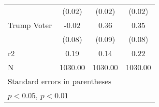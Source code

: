 \begin{table}[htbp]
\begin{tabular}{l*{3}{c}}
                    &      (0.02)        &      (0.02)        &      (0.02)        \\
[1em]
Trump Voter         &       -0.02        &        0.36\sym{**}&        0.35\sym{**}\\
                    &      (0.08)        &      (0.09)        &      (0.08)        \\
\hline
r2                  &        0.19        &        0.14        &        0.22        \\
N                   &     1030.00        &     1030.00        &     1030.00        \\
\hline\hline
\multicolumn{4}{l}{\footnotesize Standard errors in parentheses}\\
\multicolumn{4}{l}{\footnotesize \sym{*} \(p<0.05\), \sym{**} \(p<0.01\)}\\
\end{tabular}
\end{table}
